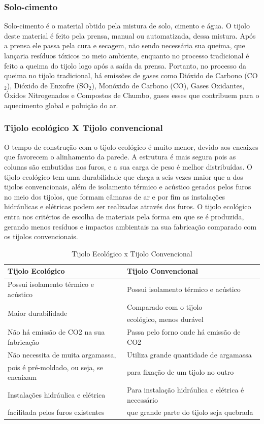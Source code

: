 \subsubsection*{\textbf{Solo-cimento}}
	
	Solo-cimento é o material obtido pela mistura de solo, cimento e água. O tijolo deste material é feito pela prensa, manual ou automatizada, dessa mistura. Após a prensa ele passa pela cura e secagem, não sendo necessária sua queima, que lançaria resíduos tóxicos no meio ambiente, enquanto no processo tradicional é feito a queima do tijolo logo após a saída da prensa. Portanto, no processo da queima no tijolo tradicional, há emissões de gases como Dióxido de Carbono (CO$_2$), Dióxido de Enxofre (SO$_2$), Monóxido de Carbono (CO), Gases Oxidantes, Óxidos Nitrogenados e Compostos de Chumbo, gases esses que contribuem para o aquecimento global e poluição do ar\cite{1980Portland}.\\

\subsubsection*{\textbf{Tijolo ecológico X Tijolo convencional}}
	O tempo de construção com o tijolo ecológico é muito menor, devido aos encaixes que favorecem o alinhamento da parede. A estrutura é mais segura pois as colunas são embutidas nos furos, e a sua carga de peso é melhor distribuídas. O tijolo ecológico tem uma durabilidade que chega a seis vezes maior que a dos tijolos convencionais, além de isolamento térmico e acústico gerados pelos furos no meio dos tijolos, que formam câmaras de ar e por fim as instalações hidráulicas e elétricas podem ser realizadas através dos furos. O tijolo ecológico entra nos critérios de escolha de materiais pela forma em que se é produzida, gerando menos resíduos e impactos ambientais na sua fabricação comparado com os tijolos convencionais.

\begin{table}[H]
\centering
\begin{tabular}{|l|l|}
\hline 
\textbf{Tijolo Ecológico} & \textbf{Tijolo Convencional}\tabularnewline
\hline 
\hline 
Possui isolamento térmico e acústico & Possui isolamento térmico e acústico\tabularnewline
\hline 
\multirow{2}{*}{Maior durabilidade} & Comparado com o tijolo \tabularnewline
 & ecológico, menos durável\tabularnewline
\hline 
Não há emissão de CO2 na sua fabricação & Passa pelo forno onde há emissão de CO2\tabularnewline
\hline 
Não necessita de muita argamassa, & Utiliza grande quantidade de argamassa \tabularnewline
 pois é pré-moldado, ou seja, se encaixam  & para fixação de um tijolo no outro\tabularnewline
\hline 
Instalações hidráulica e elétrica  & Para instalação hidráulica e elétrica é necessário \tabularnewline
facilitada pelos furos existentes & que grande parte do tijolo seja quebrada\tabularnewline
\hline 
\end{tabular}
\caption{Tijolo Ecológico x Tijolo Convencional}
\end{table}

